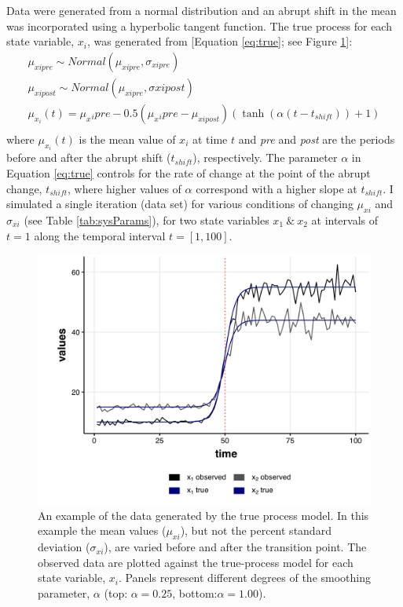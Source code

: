 \documentclass[print]{nuthesis}
\begin{document}
Data were generated from a normal distribution and an abrupt shift in the mean was incorporated using a hyperbolic tangent function. The true process for each state variable, \(x_i\), was generated from {[}Equation \eqref{eq:true}; see Figure \ref{fig:trueObsEx}{]}:
\begin{equation}
\begin{array}{rcl}
\mu_{xipre}\sim Normal(\mu_{xipre},\sigma_{xipre}) \\ 
\mu_{xipost} \sim Normal(\mu_{xipre}, \sigma{xipost}) \\ 
\mu_{x_i}(t) = \mu_x{_ipre}  - 0.5(\mu_x{_ipre}-\mu_{xipost})(\tanh(\alpha (t-t_{shift}))+1) \\ 
\end{array}
\label{eq:true}
\end{equation}
where \(\mu_{x_i}(t)\) is the mean value of \(x_i\) at time \(t\) and \emph{pre} and \emph{post} are the periods before and after the abrupt shift (\(t_{shift}\)), respectively. The parameter \(\alpha\) in Equation \eqref{eq:true} controls for the rate of change at the point of the abrupt change, \(t_{shift}\), where higher values of \(\alpha\) correspond with a higher slope at \(t_{shift}\). I simulated a single iteration (data set) for various conditions of changing \(\mu_{xi}\) and \(\sigma_{xi}\) (see Table \ref{tab:sysParams}), for two state variables \(x_1\ \&\ x_2\) at intervals of \(t=1\) along the temporal interval \(t=[1,100]\).
\begin{figure}
\includegraphics[width=0.85\linewidth]{./chapterFiles/velocity/figsCalledInDiss/changeMuBoth_tanhAlpha025-05tvdiffAlpha-1000iter_origDat} \caption{An example of the data generated by the true process model. In this example the mean values ($\mu_{xi}$), but not the percent standard deviation ($\sigma_{xi}$), are varied before and after the transition point. The observed data are plotted against the true-process model for each state variable, $x_i$. Panels represent different degrees of the smoothing parameter, $\alpha$ (top: $\alpha=0.25$, bottom:$\alpha=1.00$).}\label{fig:trueObsEx}
\end{figure}
\end{document}
